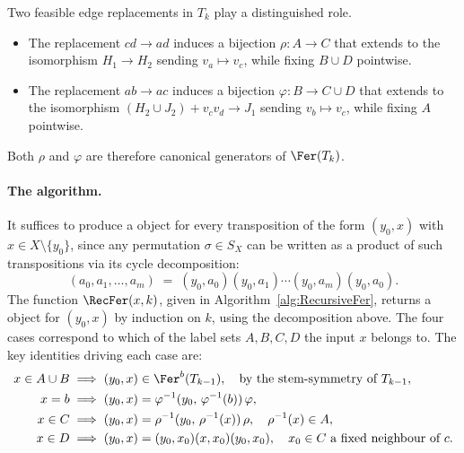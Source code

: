 Two feasible edge replacements in $T_k$ play a distinguished role.
\begin{itemize}
    \item The replacement $cd\to ad$ induces a bijection $\rho\colon A\to C$ that extends to the isomorphism $H_1\to H_2$ sending $v_a\mapsto v_c$, while fixing $B \cup D$ pointwise.
    
    \item The replacement $ab\to ac$ induces a bijection $\varphi\colon B\to C\cup D$ that extends to the isomorphism $(H_2\cup J_2)+v_cv_d\to J_1$ sending $v_b\mapsto v_c$, while fixing $A$ pointwise.
\end{itemize}
Both $\rho$ and $\varphi$ are therefore canonical generators of $\Fer(T_k)$.

\paragraph{The algorithm.}
It suffices to produce a \tfer object for every transposition of the form $(y_0, x)$ with $x \in X \setminus \{y_0\}$, since any permutation $\sigma \in S_X$ can be written as a product of such transpositions via its cycle decomposition:
$$
    (a_0, a_1, \ldots, a_m)
    \;=\;
    (y_0, a_0)(y_0, a_1) \cdots (y_0, a_m)(y_0, a_0).
$$
The function $\RecFer(x, k)$, given in Algorithm~\ref{alg:RecursiveFer}, returns a \tfer object for $(y_0, x)$ by induction on $k$, using the decomposition above.
The four cases correspond to which of the label sets $A, B, C, D$ the input $x$ belongs to.
The key identities driving each case are:
\begin{align*}
    x \in A \cup B &\implies (y_0, x) \in \Fer^b(T_{k-1}),
    \quad\text{by the stem-symmetry of } T_{k-1},\\
    x = b &\implies (y_0, x) = \varphi^{-1}(y_0,\, \varphi^{-1}(b))\,\varphi, \\
    x \in C &\implies (y_0, x) = \rho^{-1}(y_0,\, \rho^{-1}(x))\,\rho,
    \quad \rho^{-1}(x) \in A, \\
    x \in D&\implies (y_0, x) = (y_0, x_0)(x, x_0)(y_0, x_0),
    \quad x_0 \in C \text{ a fixed neighbour of } c.
\end{align*}

